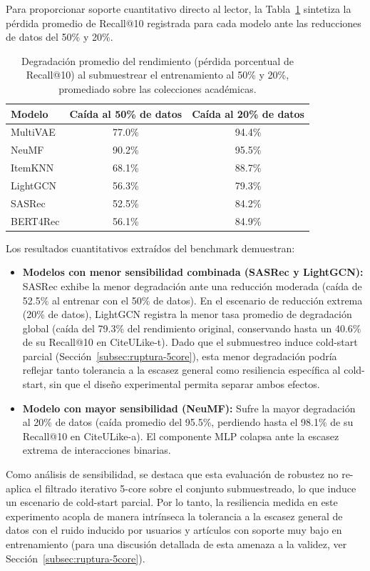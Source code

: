 \documentclass[journal]{IEEEtran}
\makeatletter
\newcommand{\at}[1]{@#1}
\makeatother
\begin{document}
Para proporcionar soporte cuantitativo directo al lector, la Tabla~\ref{tab:robustness} sintetiza la pérdida promedio de Recall\at{10} registrada para cada modelo ante las reducciones de datos del 50\% y 20\%.

\begin{table}[h]
\centering
\caption{Degradación promedio del rendimiento (pérdida porcentual de Recall\at{10}) al submuestrear el entrenamiento al 50\% y 20\%, promediado sobre las colecciones académicas.}
\label{tab:robustness}
\footnotesize
\begin{tabular}{lcc}
\toprule
\textbf{Modelo} & \textbf{Caída al 50\% de datos} & \textbf{Caída al 20\% de datos} \\
\midrule
MultiVAE & 77.0\% & 94.4\% \\
NeuMF    & 90.2\% & 95.5\% \\
ItemKNN  & 68.1\% & 88.7\% \\
LightGCN & 56.3\% & 79.3\% \\
SASRec   & 52.5\% & 84.2\% \\
BERT4Rec & 56.1\% & 84.9\% \\
\bottomrule
\end{tabular}
\end{table}

Los resultados cuantitativos extraídos del benchmark demuestran:
\begin{itemize}
    \item \textbf{Modelos con menor sensibilidad combinada (SASRec y LightGCN):} SASRec exhibe la menor degradación ante una reducción moderada (caída de 52.5\% al entrenar con el 50\% de datos). En el escenario de reducción extrema (20\% de datos), LightGCN registra la menor tasa promedio de degradación global (caída del 79.3\% del rendimiento original, conservando hasta un 40.6\% de su Recall\at{10} en CiteULike-t). Dado que el submuestreo induce cold-start parcial (Sección~\ref{subsec:ruptura-5core}), esta menor degradación podría reflejar tanto tolerancia a la escasez general como resiliencia específica al cold-start, sin que el diseño experimental permita separar ambos efectos.
    \item \textbf{Modelo con mayor sensibilidad (NeuMF):} Sufre la mayor degradación al 20\% de datos (caída promedio del 95.5\%, perdiendo hasta el 98.1\% de su Recall\at{10} en CiteULike-a). El componente MLP colapsa ante la escasez extrema de interacciones binarias.
\end{itemize}
Como análisis de sensibilidad, se destaca que esta evaluación de robustez no re-aplica el filtrado iterativo 5-core sobre el conjunto submuestreado, lo que induce un escenario de cold-start parcial. Por lo tanto, la resiliencia medida en este experimento acopla de manera intrínseca la tolerancia a la escasez general de datos con el ruido inducido por usuarios y artículos con soporte muy bajo en entrenamiento (para una discusión detallada de esta amenaza a la validez, ver Sección~\ref{subsec:ruptura-5core}).
\end{document}
